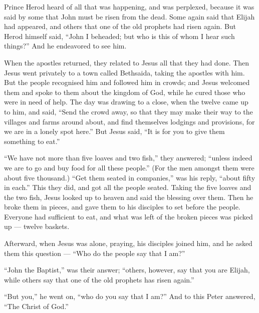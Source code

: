  Prince Herod heard of all that was happening, and was
perplexed, because it was said by some that John must be risen from the
dead.  Some again said that Elijah had appeared, and others
that one of the old prophets had risen again.  But Herod
himself said, ``John I beheaded; but who is this of whom I hear such
things?'' And he endeavored to see him.

 When the apostles returned, they related to Jesus all that
they had done. Then Jesus went privately to a town called Bethsaida,
taking the apostles with him.  But the people recognised
him and followed him in crowds; and Jesus welcomed them and spoke to
them about the kingdom of God, while he cured those who were in need of
help.  The day was drawing to a close, when the twelve came
up to him, and said, ``Send the crowd away, so that they may make their
way to the villages and farms around about, and find themselves lodgings
and provisions, for we are in a lonely spot here.''  But
Jesus said, ``It is for you to give them something to eat.''

``We have not more than five loaves and two fish,'' they answered;
``unless indeed we are to go and buy food for all these people.''
 (For the men amongst them were about five thousand.) ``Get
them seated in companies,'' was his reply, ``about fifty in each.''
 This they did, and got all the people seated.
 Taking the five loaves and the two fish, Jesus looked up
to heaven and said the blessing over them. Then he broke them in pieces,
and gave them to his disciples to set before the people. 
Everyone had sufficient to eat, and what was left of the broken pieces
was picked up --- twelve baskets.

 Afterward, when Jesus was alone, praying, his disciples
joined him, and he asked them this question --- ``Who do the people say
that I am?''

 ``John the Baptist,'' was their answer; ``others, however,
say that you are Elijah, while others say that one of the old prophets
has risen again.''

 ``But you,'' he went on, ``who do you say that I am?'' And
to this Peter answered, ``The Christ of God.''


